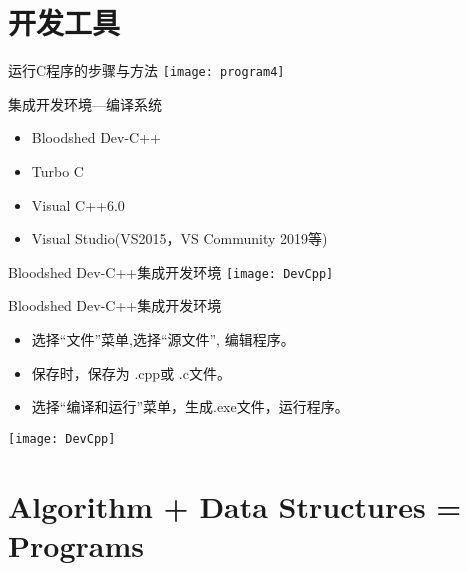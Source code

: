 
\section{开发工具}

\begin{frame}{运行C程序的步骤与方法}
\centering
\texttt{[image: program4]}
\end{frame}

\begin{frame}{集成开发环境---编译系统}
\begin{itemize}
\setlength{\itemsep}{.5cm}
\item Bloodshed Dev-C++ 
\item Turbo C
\item Visual C++6.0 
\item Visual Studio(VS2015，VS Community 2019等)
\end{itemize}
\end{frame}

\begin{frame}{Bloodshed Dev-C++集成开发环境}
\texttt{[image: DevCpp]}   
\end{frame}

\begin{frame}{Bloodshed Dev-C++集成开发环境}
\begin{itemize}
\item 选择“文件”菜单,选择“源文件”, 编辑程序。
\item 保存时，保存为 .cpp或 .c文件。
\item 选择“编译和运行”菜单，生成.exe文件，运行程序。  
\end{itemize}
\centering 
\texttt{[image: DevCpp]}   
\end{frame}

\section{Algorithm + Data Structures = Programs}

